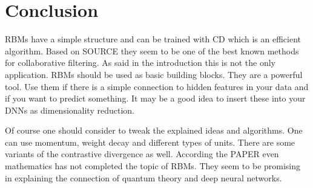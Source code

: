 \documentclass[crop=false,10pt]{standalone}
\begin{document}
  \section{Conclusion} %
  \label{sec:Conclusion}
    RBMs have a simple structure and can be trained with CD which is an efficient algorithm.
    Based on SOURCE they seem to be one of the best known methods for collaborative filtering.
    As said in the introduction this is not the only application.
    RBMs should be used as basic building blocks.
    They are a powerful tool.
    Use them if there is a simple connection to hidden features in your data and if you want to predict something.
    It may be a good idea to insert these into your DNNs as dimensionality reduction.

    Of course one should consider to tweak the explained ideas and algorithms.
    One can use momentum, weight decay and different types of units.
    There are some variants of the contrastive divergence as well.
    According the PAPER even mathematics has not completed the topic of RBMs.
    They seem to be promising in explaining the connection of quantum theory and deep neural networks.
\end{document}
